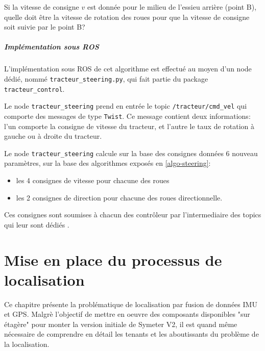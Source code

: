 \documentclass[12pt,a4paper]{report}
\begin{document}
			\para Si la vitesse de consigne $v$ est donnée pour le milieu de l'essieu arrière (point B), quelle doit être la vitesse de rotation des roues pour que la vitesse de consigne soit suivie par le point B?
			
			
			\paragraph{Implémentation sous ROS}
			
			L'implémentation sous ROS de cet algorithme est effectué au moyen d'un node dédié, nommé \verb|tracteur_steering.py|, qui fait partie du package \verb|tracteur_control|.
			
			\para Le node \verb|tracteur_steering| prend en entrée le topic \verb|/tracteur/cmd_vel| qui comporte des messages de type \verb|Twist|. Ce message contient deux informations: l'un comporte la consigne de vitesse du tracteur, et l'autre le taux de rotation à gauche ou à droite du tracteur.
			
			\para Le node \verb|tracteur_steering| calcule sur la base des consignes données 6 nouveau paramètres, sur la base des algorithmes exposés en \ref{algo-steering}:
			\begin{itemize}
				\item les 4 consignes de vitesse pour chacune des roues
				\item les 2 consignes de direction pour chacune des roues directionnelle.
			\end{itemize}
		
			\para Ces consignes sont soumises à chacun des contrôleur par l'intermediaire des topics qui leur sont dédiés .
			
			
		
		
		

\chapter{Mise en place du processus de localisation}

Ce chapitre présente la problématique de localisation par fusion de données IMU et GPS. Malgrè l'objectif de mettre en oeuvre des composants disponibles "sur étagère" pour monter la version initiale de Symeter V2, il est quand même nécessaire de comprendre en détail les tenants et les aboutissants du problème de la localisation.
\end{document}
